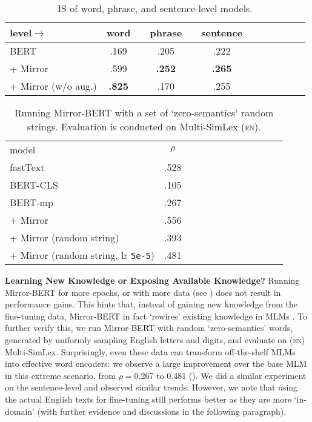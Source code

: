 \documentclass[11pt]{article}
\newcommand{\en}{{\textsc{en}}\xspace}
\begin{document}
\begin{table}[!t]
\centering
\def\arraystretch{0.8}
\fontsize{7.9}{10}\selectfont
\begin{tabular}{lccccccccccc}
\cmidrule[1.0pt]{1-10}
level$\rightarrow$ & word & & phrase & & sentence \\
\midrule
BERT  & .169 && .205 && .222 \\
+ Mirror & .599 &&  \textbf{.252} && \textbf{.265} \\
+ Mirror (w/o aug.) &  \textbf{.825} && .170 && .255  \\
\cmidrule[1.0pt]{1-10}
\end{tabular}
\vspace{-1.5mm}
\caption{IS of word, phrase, and sentence-level models.}
\label{tab:is}
\vspace{-1mm}
\end{table}


\begin{table}[]
\centering
\setlength{\tabcolsep}{2.0pt}
\small
\begin{tabular}{lccccccccccc}
\cmidrule[1.0pt]{1-10}
model &  $\rho$ \\
\cmidrule[1.0pt]{1-10}
fastText & .528 \\
\cmidrule[1.0pt]{1-10}
BERT-CLS & .105 \\
BERT-mp & .267 \\
\hdashline
+ Mirror & .556 \\
\hdashline
+ Mirror (random string) & .393 \\
+ Mirror (random string, lr \texttt{5e-5}) & .481 \\
\cmidrule[1.0pt]{1-10}
\end{tabular}
 \vspace{-1.5mm}
\caption{Running Mirror-BERT with a set of `zero-semantics' random strings. Evaluation is conducted on Multi-SimLex (\en).}
\label{tab:random_string_full}
\end{table}



\vspace{1.5mm}
\noindent \textbf{Learning New Knowledge or Exposing Available Knowledge?} Running Mirror-BERT for more epochs, or with more data (see ) does not result in performance gains. This hints that, instead of gaining new knowledge from the fine-tuning data, Mirror-BERT in fact `rewires' existing knowledge in MLMs \cite{Zaken:2020bitfit}. To further verify this, we run Mirror-BERT with random `zero-semantics' words, generated by uniformly sampling English letters and digits, and evaluate on (\en) Multi-SimLex. Surprisingly, even these data can transform off-the-shelf MLMs into effective word encoders: we observe a large improvement over the base MLM in this extreme scenario, from $\rho=$0.267 to 0.481 (). We did a similar experiment on the sentence-level and observed similar trends. However, we note that using the actual English texts for fine-tuning still performs better as they are more `in-domain' (with further evidence and discussions in the following paragraph). 
\end{document}
